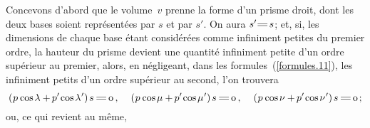 \documentclass[11pt, twoside, leqno]{article}
\renewcommand{\eqref}[1]{(\ref{#1})}
\newcommand\equals{\scalebox{1.5}[1]{$=$}}
\newcommand\cosine{\operatorname{cos} \hspace{-0.1ex}}
\begin{document}
Concevons d'abord que le volume~\;$v$\; prenne la forme d'un prisme droit, dont les deux bases soient représentées par \;$s$\; et par \;$s'$.\hspace{.5ex} On aura \;${s' \equals \hspace{.2ex} s}$\hspace{.3ex};\hspace{.7ex} et, si, les dimensions de chaque base étant considérées comme infiniment petites du premier ordre, la hauteur du prisme devient une quantité infiniment petite d'un ordre supérieur au premier, alors, en négligeant, dans les formules~\eqref{formules.11}, les infiniment petits d'un ordre supérieur au second, l'on trouvera
\begin{equation*}
(\hspace{.1ex} p \hspace{.1ex} \cosine \lambda + \hspace{-0.15ex} p' \hspace{-0.2ex} \cosine \lambda\hspace{.1ex}' ) \hspace{1.2pt} s \hspace{.4ex} \equals \hspace{.3ex} \text{o}
\hspace{.4ex} \text{,}
\hspace{1.3em}
(\hspace{.1ex} p \hspace{.1ex} \cosine \mu + \hspace{-0.15ex} p' \hspace{-0.2ex} \cosine \mu\hspace{.1ex}' ) \hspace{1.2pt} s \hspace{.4ex} \equals \hspace{.3ex} \text{o}
\hspace{.4ex} \text{,}
\hspace{1.3em}
(\hspace{.1ex} p \hspace{.1ex} \cosine \nu + \hspace{-0.15ex} p' \hspace{-0.2ex} \cosine \nu\hspace{.1ex}' ) \hspace{1.2pt} s \hspace{.4ex} \equals \hspace{.3ex} \text{o}
\hspace{.3ex} \text{;}
\end{equation*}
ou, ce qui revient au même,
\end{document}

